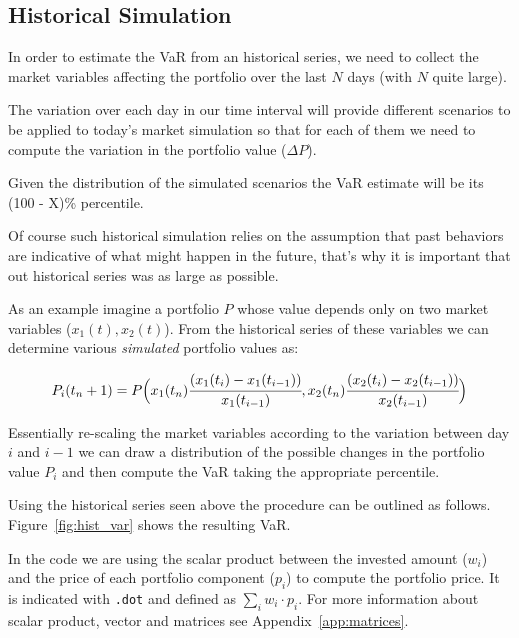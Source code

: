 \subsection{Historical Simulation}\label{historical-simulation}

In order to estimate the VaR from an historical series, we need to
collect the market variables affecting the portfolio over the last \(N\)
days (with \(N\) quite large).

The variation over each day in our time interval will provide different
scenarios to be applied to today's market simulation so that for each of
them we need to compute the variation in the portfolio value
(\(\Delta P\)). 

Given the distribution of the simulated scenarios the VaR estimate 
will be its (100 - X)\% percentile. 

Of course such historical simulation relies on the assumption that past
behaviors are indicative of what might happen in the future, that's why it 
is important that out historical series was as large as possible.

As an example imagine a portfolio \(P\) whose value depends only on two market
variables (\(x_1(t) , x_2(t)\)). From the historical series of these
variables we can determine various \emph{simulated} portfolio
values as:

\[P_i(t_n+1) = P\Big(x_1(t_n)\cfrac{(x_1(t_i)-x_1(t_{i-1}))}{x_1(t_{i-1})}, x_2(t_n)\cfrac{(x_2(t_i)-x_2(t_{i-1}))}{x_2(t_{i-1})}\Big)\]

Essentially re-scaling the market variables according to the variation
between day \(i\) and \(i-1\) we can draw a distribution of the possible
changes in the portfolio value \(P_i\) and then compute the VaR taking
the appropriate percentile.

Using the historical series seen above the procedure can be outlined as follows. Figure~\ref{fig:hist_var} shows the resulting VaR. 

In the code we are using the scalar product between the invested amount ($w_i$) and the price of each portfolio component ($p_i$) to compute the portfolio price. It is indicated with \texttt{.dot} and defined as $\sum_{i} w_i \cdot p_i$.
For more information about scalar product, vector and matrices see Appendix~\ref{app:matrices}. 

